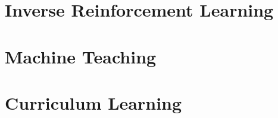 \section{Inverse Reinforcement Learning}


\section{Machine Teaching}


\section{Curriculum Learning}

